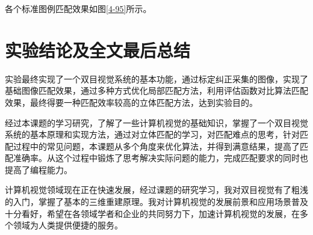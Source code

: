 各个标准图例匹配效果如图\ref{4-95}所示。

\section{实验结论及全文最后总结}

实验最终实现了一个双目视觉系统的基本功能，通过标定纠正采集的图像，实现了基础图像匹配效果，通过多种方式优化局部匹配方法，利用评估函数对比算法匹配效果，最终得要一种匹配效率较高的立体匹配方法，达到实验目的。

经过本课题的学习研究，了解了一些计算机视觉的基础知识，掌握了一个双目视觉系统的基本原理和实现方法，通过对立体匹配的学习，对匹配难点的思考，针对匹配过程中的常见问题，本课题从多个角度来优化算法，并得到满意结果，提高了匹配准确率。从这个过程中锻炼了思考解决实际问题的能力，完成匹配要求的同时也提高了编程能力。

计算机视觉领域现在正在快速发展，经过课题的研究学习，我对双目视觉有了粗浅的入门，掌握了基本的三维重建原理。我对计算机视觉的发展前景和应用场景普及十分看好，希望在各领域学者和企业的共同努力下，加速计算机视觉的发展，在多个领域为人类提供便捷的服务。